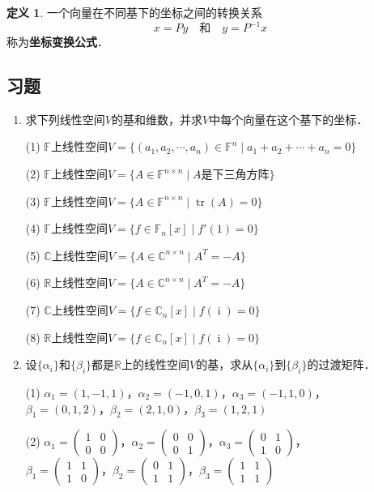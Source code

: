 \documentclass[a4paper,fontset=windows]{ctexbook}
\theoremstyle{definition}
\newtheorem{definition}{定义}[chapter]
\DeclareMathOperator{\I}{i}
\DeclareMathOperator{\tr}{tr}
\begin{document}
\begin{definition}
一个向量在不同基下的坐标之间的转换关系
\begin{equation}\label{eq8.2}
x=Py\quad\text{和}\quad y=P^{-1}x
\end{equation}
称为{\bf 坐标变换公式}．
\end{definition}

\subsection*{习题}

\begin{enumerate}
\item 求下列线性空间$V$的基和维数，并求$V$中每个向量在这个基下的坐标．

(1) $\mathbb{F}$上线性空间$V=\{(a_1,a_2,\cdots,a_n)\in\mathbb{F}^n\mid a_1+a_2+\cdots+a_n=0\}$

(2) $\mathbb{F}$上线性空间$V=\{A\in\mathbb{F}^{n\times n}\mid\text{$A$是下三角方阵}\}$

(3) $\mathbb{F}$上线性空间$V=\{A\in\mathbb{F}^{n\times n}\mid\tr(A)=0\}$

(4) $\mathbb{F}$上线性空间$V=\{f\in\mathbb{F}_n[x]\mid f'(1) =0\}$

(5) $\mathbb{C}$上线性空间$V=\{A\in\mathbb{C}^{n\times n}\mid A^T=-A\}$

(6) $\mathbb{R}$上线性空间$V=\{A\in\mathbb{C}^{n\times n}\mid A^T=-A\}$

(7) $\mathbb{C}$上线性空间$V=\{f\in\mathbb{C}_n[x]\mid f(\I)=0\}$

(8) $\mathbb{R}$上线性空间$V=\{f\in\mathbb{C}_n[x]\mid f(\I)=0\}$

\item 设$\{\alpha_i\}$和$\{\beta_i\}$都是$\mathbb{R}$上的线性空间$V$的基，求从$\{\alpha_i\}$到$\{\beta_i\}$的过渡矩阵．

(1) $\alpha_1=(1,-1,1)$，$\alpha_2=(-1,0,1)$，$\alpha_3=(-1,1,0)$，\\ \hspace*{18pt}$\beta_1=(0,1,2)$，$\beta_2=(2,1,0)$，$\beta_3=(1,2,1)$

(2) $\alpha_1=\begin{pmatrix}1&0 \\ 0&0\end{pmatrix}$，$\alpha_2=\begin{pmatrix}0&0 \\ 0&1\end{pmatrix}$，$\alpha_3=\begin{pmatrix}0&1 \\ 1&0\end{pmatrix}$，\\ \hspace*{18pt}$\beta_1=\begin{pmatrix}1&1 \\ 1&0\end{pmatrix}$，$\beta_2=\begin{pmatrix}0&1 \\ 1&1\end{pmatrix}$，$\beta_3=\begin{pmatrix}1&1 \\ 1&1\end{pmatrix}$


\end{enumerate}
\end{document}
